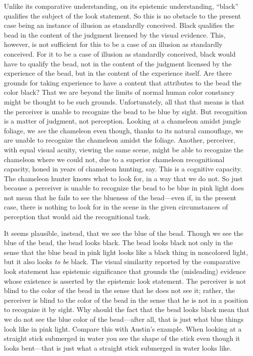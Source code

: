 \documentclass[12pt]{article}
\begin{document}
Unlike its comparative understanding, on its epistemic understanding, ``black'' qualifies the subject of the look statement. So this is no obstacle to the present case being an instance of illusion as standardly conceived. Black qualifies the bead in the content of the judgment licensed by the visual evidence. This, however, is not sufficient for this to be a case of an illusion as standardly conceived. For it to be a case of illusion as standardly conceived, black would have to qualify the bead, not in the content of the judgment licensed by the experience of the bead, but in the content of the experience itself. Are there grounds for taking experience to have a content that attributes to the bead the color black? That we are beyond the limits of normal human color constancy might be thought to be such grounds. Unfortunately, all that that means is that the perceiver is unable to recognize the bead to be blue by sight. But recognition is a matter of judgment, not perception. Looking at a chameleon amidst jungle foliage, we \emph{see} the chameleon even though, thanks to its natural camouflage, we are unable to recognize the chameleon amidst the foliage. Another, perceiver, with equal visual acuity, viewing the same scene, might be able to recognize the chameleon where we could not, due to a superior chameleon recognitional capacity, honed in years of chameleon hunting, say. This is a cognitive capacity. The chameleon hunter knows what to look for, in a way that we do not. So just because a perceiver is unable to recognize the bead to be blue in pink light does not mean that he fails to see the blueness of the bead---even if, in the present case, there is nothing to look for in the scene in the given circumstances of perception that would aid the recognitional task.

It seems plausible, instead, that we see the blue of the bead. Though we see the blue of the bead, the bead looks black. The bead looks black not only in the sense that the blue bead in pink light looks like a black thing in noncolored light, but it also looks \emph{to be} black. The visual similarity reported by the comparative look statement has epistemic significance that grounds the (misleading) evidence whose existence is asserted by the epistemic look statement. The perceiver is not blind to the color of the bead in the sense that he does not see it; rather, the perceiver is blind to the color of the bead in the sense that he is not in a position to recognize it by sight. Why should the fact that the bead looks black mean that we do not see the blue color of the bead---after all, that is just what blue things look like in pink light. Compare this with Austin's \citeyear{Austin:1962lr} example. When looking at a straight stick submerged in water you see the shape of the stick even though it looks bent---that is just what a straight stick submerged in water looks like. 
\end{document}
